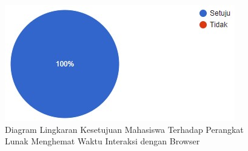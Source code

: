 	\begin{figure}[H]
		\centering
		\includegraphics[scale=0.7]{Gambar/diagramLingkaran.jpg}
		\caption{Diagram Lingkaran Kesetujuan Mahasiswa Terhadap Perangkat Lunak Menghemat Waktu Interaksi dengan Browser} 
		\label{fig:interaksi}
	\end{figure}

	
